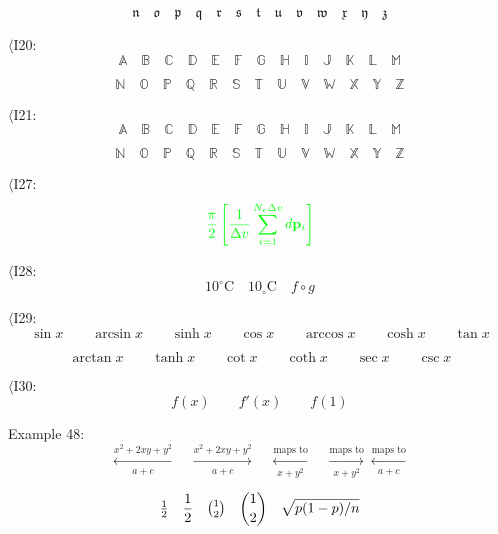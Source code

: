 \documentclass{book}
\begin{document}
\[\mathbf{\mathfrak{n}}\quad\mathbf{\mathfrak{o}}\quad \mathbf{\mathfrak{p}}\quad \mathbf{\mathfrak{q}}\quad \mathbf{\mathfrak{r}}\quad
	\mathbf{\mathfrak{s}}\quad \mathbf{\mathfrak{t}}\quad \mathbf{\mathfrak{u}}\quad \mathbf{\mathfrak{v}}\quad
	\mathbf{\mathfrak{w}}\quad \mathbf{\mathfrak{x}}\quad \mathbf{\mathfrak{y}}\quad \mathbf{\mathfrak{z}}\]

$\langle$I20:
\[\mathbb{A}\quad \mathbb{B}\quad \mathbb{C}\quad \mathbb{D}\quad
	\mathbb{E}\quad \mathbb{F}\quad \mathbb{G}\quad \mathbb{H}\quad
	\mathbb{I}\quad \mathbb{J}\quad \mathbb{K}\quad \mathbb{L}\quad
	\mathbb{M}\]

\[\mathbb{N}\quad \mathbb{O}\quad \mathbb{P}\quad
	\mathbb{Q}\quad \mathbb{R}\quad \mathbb{S}\quad \mathbb{T}\quad
	\mathbb{U}\quad \mathbb{V}\quad \mathbb{W}\quad \mathbb{X}\quad
	\mathbb{Y}\quad \mathbb{Z}\]

$\langle$I21:
\[\mathbf{\mathbb{A}}\quad \mathbf{\mathbb{B}}\quad \mathbf{\mathbb{C}}\quad \mathbf{\mathit{\mathbb{D}}}\quad
	\mathbf{\mathbb{E}}\quad \mathbf{\mathbb{F}}\quad \mathbf{\mathbb{G}}\quad \mathbf{\mathbb{H}}\quad
	\mathbf{\mathbb{I}}\quad \mathbf{\mathbb{J}}\quad \mathbf{\mathbb{K}}\quad \mathbf{\mathbb{L}}\quad
	\mathbf{\mathbb{M}}\]

\[\mathbf{\mathbb{N}}\quad \mathbf{\mathbb{O}}\quad \mathbf{\mathbb{P}}\quad
	\mathbf{\mathbb{Q}}\quad \mathbf{\mathbb{R}}\quad \mathbf{\mathbb{S}}\quad \mathbf{\mathbb{T}}\quad
	\mathbf{\mathbb{U}}\quad \mathbf{\mathbb{V}}\quad \mathbf{\mathbb{W}}\quad \mathbf{\mathbb{X}}\quad
	\mathbf{\mathbb{Y}}\quad \mathbf{\mathbb{Z}}\]

$\langle$I27:
\[\color{green}{\frac{\pi}{2} \left[\frac{1}{\Delta v}\sum_{i=1}^{N_{e}\Delta v}d\mathbf{p}_{i}\right]}\]

$\langle$I28:
\[{10}^{\circ}\text{C}\quad {10}_{\circ}\text{C}\quad f\circ g\]

$\langle$I29:
\[\sin x\qquad \arcsin x\qquad \sinh x\qquad \cos x\qquad \arccos x\qquad
	\cosh x\qquad \tan x\]

\[\arctan x\qquad \tanh x\qquad \cot x\qquad \coth x\qquad \sec x\qquad \csc x\]

$\langle$I30:
\[f(x)\qquad f'(x) \qquad f(1)\]

\noindent Example 48:
\[
	\xleftarrow[a+c]{x^2+2xy+y^2} \quad
	\xrightarrow[a+c]{x^2+2xy+y^2}\quad
	\xleftarrow[x+y^2]{\text{maps to}} \quad
	\xrightarrow[x+y^2]{\text{maps to}}
	\xleftarrow[a+c]{\text{maps to}}
\]

\[
	\hbox{$\frac12$} \quad \frac12\quad \hbox{${1\choose2}$}\quad {1\choose2} \quad \sqrt{p(1-p)/n}
\]
\end{document}
